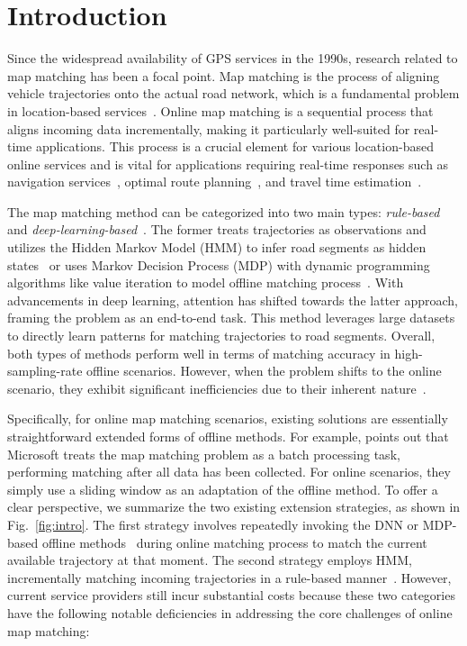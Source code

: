 \section{Introduction}
Since the widespread availability of GPS services in the 1990s, research related to map matching has been a focal point. Map matching is the process of aligning vehicle trajectories onto the actual road network, which is a fundamental problem in location-based services~\cite{survey_magzine, stsurvey}. 
Online map matching is a sequential process that aligns incoming data incrementally, making it particularly well-suited for real-time applications. This process is a crucial element for various location-based online services and is vital for applications requiring real-time responses such as navigation services~\cite{navigation2}, optimal route planning~\cite{Learning2Route, AnySto}, and travel time estimation~\cite{TTE, TTE2, TTE3}.

The map matching method can be categorized into two main types: \textit{rule-based}~\cite{HMM,FMM,MDPMM} and \textit{deep-learning-based}~\cite{deepmmzhao, deepmmfeng, mtrajrec, l2mm, graphmm}. The former treats trajectories as observations and utilizes the Hidden Markov Model (HMM) to infer road segments as hidden states~\cite{HMMbase} or uses Markov Decision Process (MDP) with dynamic programming algorithms like value iteration to model offline matching process~\cite{MDPMM}. With advancements in deep learning, attention has shifted towards the latter approach, framing the problem as an end-to-end task. This method leverages large datasets to directly learn patterns for matching trajectories to road segments. Overall, both types of methods perform well in terms of matching accuracy in high-sampling-rate offline scenarios. However, when the problem shifts to the online scenario, they exhibit significant inefficiencies due to their inherent nature~\cite{praGuide, hmmAna, mmsurvey,surveyVMMT}.

Specifically, for online map matching scenarios, existing solutions are essentially straightforward extended forms of offline methods. For example, \cite{HMM} points out that Microsoft treats the map matching problem as a batch processing task, performing matching after all data has been collected. For online scenarios, they simply use a sliding window as an adaptation of the offline method. To offer a clear perspective, we summarize the two existing extension strategies, as shown in Fig.~\ref{fig:intro}. The first strategy involves repeatedly invoking the DNN or MDP-based offline methods~\cite{mtrajrec,l2mm, graphmm,MDPMM} during online matching process to match the current available trajectory at that moment. The second strategy employs HMM, incrementally matching incoming trajectories in a rule-based manner~\cite{onlinelearning, AMM}. However, current service providers still incur substantial costs because these two categories have the following notable deficiencies in addressing the core challenges of online map matching:

